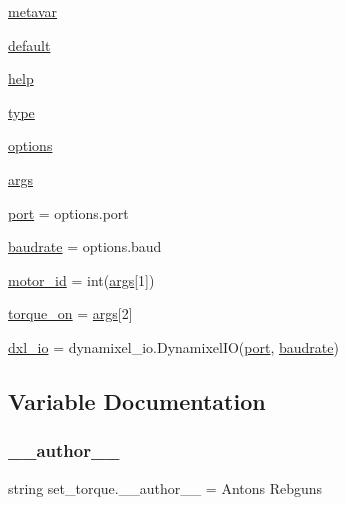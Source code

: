 \begin{DoxyCompactItemize}
\item 
\hyperlink{namespaceset__torque_a57041a13e660a42e4474b41d25d80afd}{metavar}
\item 
\hyperlink{namespaceset__torque_a310837d7f7700e535fa1eecc229f3573}{default}
\item 
\hyperlink{namespaceset__torque_af4b7186d080600dac5aab579c38b1e26}{help}
\item 
\hyperlink{namespaceset__torque_a4088ec83409d3c6941ccab6445575c21}{type}
\item 
\hyperlink{namespaceset__torque_a0b961e29ab6d708b77dab37ac082ee90}{options}
\item 
\hyperlink{namespaceset__torque_a3021c459017eab874ec0a0da88be61f0}{args}
\item 
\hyperlink{namespaceset__torque_adbb76185d3bc8d9acc1d2d233efb3ef9}{port} = options.\+port
\item 
\hyperlink{namespaceset__torque_a5826fc0f8ce37034c1673138f0c219c1}{baudrate} = options.\+baud
\item 
\hyperlink{namespaceset__torque_a92f4588eb1a86aa95b83ae635853ae61}{motor\+\_\+id} = int(\hyperlink{namespaceset__torque_a3021c459017eab874ec0a0da88be61f0}{args}\mbox{[}1\mbox{]})
\item 
\hyperlink{namespaceset__torque_af05254d95cb5e25b3cd846f74ecbaac5}{torque\+\_\+on} = \hyperlink{namespaceset__torque_a3021c459017eab874ec0a0da88be61f0}{args}\mbox{[}2\mbox{]}
\item 
\hyperlink{namespaceset__torque_a91411d9dc276feda6240d590df9d3c96}{dxl\+\_\+io} = dynamixel\+\_\+io.\+Dynamixel\+IO(\hyperlink{namespaceset__torque_adbb76185d3bc8d9acc1d2d233efb3ef9}{port}, \hyperlink{namespaceset__torque_a5826fc0f8ce37034c1673138f0c219c1}{baudrate})
\end{DoxyCompactItemize}


\subsection{Variable Documentation}
\mbox{\label{namespaceset__torque_a2e69378535d5b94d4df3a687ae509adb}} 
\subsubsection{\texorpdfstring{\+\_\+\+\_\+author\+\_\+\+\_\+}{\_\_author\_\_}}
{\footnotesize\ttfamily string set\+\_\+torque.\+\_\+\+\_\+author\+\_\+\+\_\+ = \textquotesingle{}Antons Rebguns\textquotesingle{}\hspace{0.3cm}{\ttfamily [private]}}



